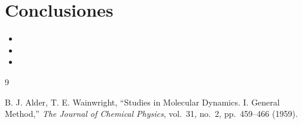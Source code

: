 \documentclass[11pt,a4paper]{article}
\begin{document}
\FloatBarrier
\section{Conclusiones}
\label{sec:conclusiones}

\begin{itemize}
  \item %
  \item %
  \item %
\end{itemize}

\FloatBarrier
\begin{thebibliography}{9}

B. J. Alder, T. E. Wainwright,
``Studies in Molecular Dynamics. I. General Method,''
\emph{The Journal of Chemical Physics}, vol.\ 31, no.\ 2, pp.\ 459--466 (1959).

\end{thebibliography}
\end{document}
